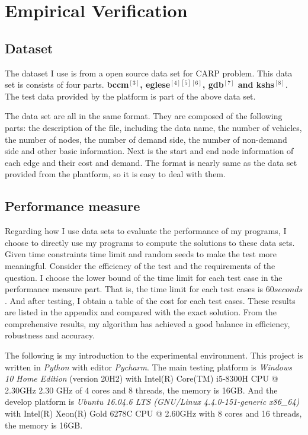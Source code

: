 \documentclass[conference,compsoc]{IEEEtran}
\begin{document}
\section{Empirical Verification}

\subsection{Dataset}
The dataset I use is from a open source data set for CARP problem. This data set is consists of four parts. \textbf{bccm$^{[3]}$, eglese$^{[4][5][6]}$, gdb$^{[7]}$ and kshs$^{[8]}$}. The test data provided by the platform is part of the above data set. 

The data set are all in the same format. They are composed of the following parts: the description of the file, including the data name, the number of vehicles, the number of nodes, the number of demand side, the number of non-demand side and other basic information. Next is the start and end node information of each edge and their cost and demand. The format is nearly same as the data set provided from the plantform, so it is easy to deal with them.

\subsection{Performance measure}
Regarding how I use data sets to evaluate the performance of my programs, I choose to directly use my programs to compute the solutions to these data sets. Given time constraints time limit and random seeds to make the test more meaningful. Consider the efficiency of the test and the requirements of the question. I choose the lower bound of the time limit for each test case in the performance measure part. That is, the time limit for each test cases is $60 seconds$. And after testing, I obtain a table of the cost for each test cases. These results are listed in the appendix and compared with the exact solution. From the comprehensive results, my algorithm has achieved a good balance in efficiency, robustness and accuracy.

The following is my introduction to the experimental environment. This project is written in \emph{Python} with editor \emph{Pycharm}. The main testing platform is \emph{Windows 10 Home Edition} (version 20H2) with Intel(R) Core(TM) i5-8300H CPU @ 2.30GHz 2.30 GHz of 4 cores and 8 threads, the memory is 16GB. And the develop platform is \emph{Ubuntu 16.04.6 LTS (GNU/Linux 4.4.0-151-generic x86\_64)} with Intel(R) Xeon(R) Gold 6278C CPU @ 2.60GHz with 8 cores and 16 threads, the memory is 16GB.
\end{document}
